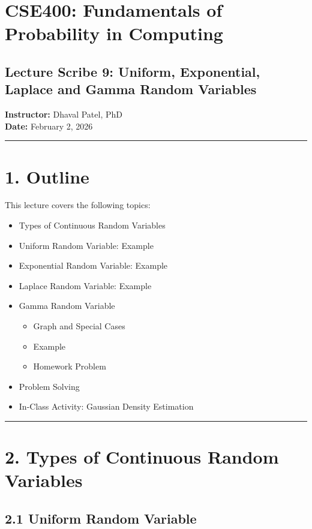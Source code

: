 \documentclass[12pt]{article}
\begin{document}
\section*{\textbf{CSE400: Fundamentals of Probability in Computing}}

\subsection*{\textbf{Lecture Scribe 9: Uniform, Exponential, Laplace and Gamma Random Variables}}

\textbf{Instructor:} Dhaval Patel, PhD\\
\textbf{Date:} February 2, 2026

\hrule
\vspace{1em}

\section*{\textbf{1. Outline}}

This lecture covers the following topics:

\begin{itemize}
    \item Types of Continuous Random Variables
    \item Uniform Random Variable: Example
    \item Exponential Random Variable: Example
    \item Laplace Random Variable: Example
    \item Gamma Random Variable
    \begin{itemize}
        \item Graph and Special Cases
        \item Example
        \item Homework Problem
    \end{itemize}
    \item Problem Solving
    \item In-Class Activity: Gaussian Density Estimation
\end{itemize}

\hrule
\vspace{1em}

\section*{\textbf{2. Types of Continuous Random Variables}}

\subsection*{\textbf{2.1 Uniform Random Variable}}
\end{document}
